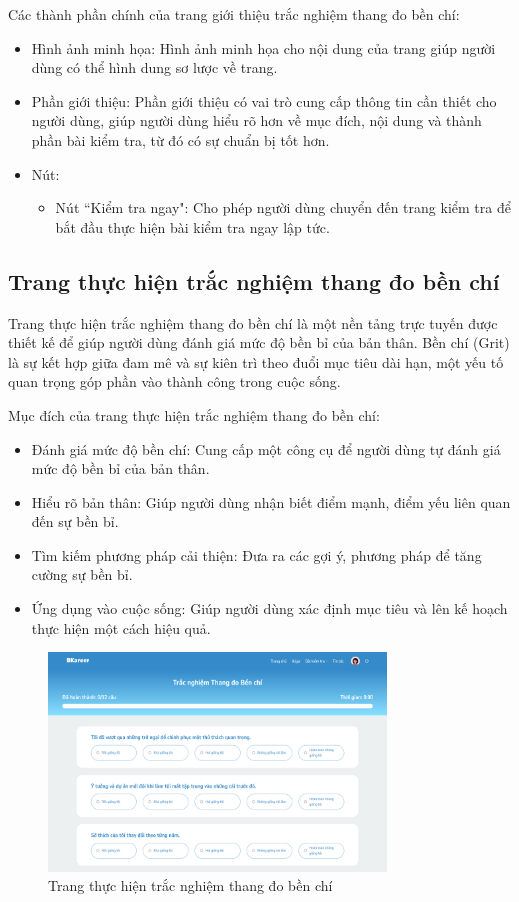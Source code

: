 Các thành phần chính của trang giới thiệu trắc nghiệm thang đo bền chí:
\begin{itemize}
    \item Hình ảnh minh họa: Hình ảnh minh họa cho nội dung của trang giúp người dùng có thể hình dung sơ lược về trang.
    \item Phần giới thiệu: Phần giới thiệu có vai trò cung cấp thông tin cần thiết cho người dùng, giúp người dùng hiểu rõ hơn về mục đích, nội dung và thành phần bài kiểm tra, từ đó có sự chuẩn bị tốt hơn.
    \item Nút:
        \begin{itemize}
            \item Nút ``Kiểm tra ngay": Cho phép người dùng chuyển đến trang kiểm tra để bắt đầu thực hiện bài kiểm tra ngay lập tức.
        \end{itemize}
\end{itemize}


\subsection{Trang thực hiện trắc nghiệm thang đo bền chí}
Trang thực hiện trắc nghiệm thang đo bền chí là một nền tảng trực tuyến được thiết kế để giúp người dùng đánh giá mức độ bền bỉ của bản thân. Bền chí (Grit) là sự kết hợp giữa đam mê và sự kiên trì theo đuổi mục tiêu dài hạn, một yếu tố quan trọng góp phần vào thành công trong cuộc sống.

Mục đích của trang thực hiện trắc nghiệm thang đo bền chí:
\begin{itemize}
    \item Đánh giá mức độ bền chí: Cung cấp một công cụ để người dùng tự đánh giá mức độ bền bỉ của bản thân.
    \item Hiểu rõ bản thân: Giúp người dùng nhận biết điểm mạnh, điểm yếu liên quan đến sự bền bỉ.
    \item Tìm kiếm phương pháp cải thiện: Đưa ra các gợi ý, phương pháp để tăng cường sự bền bỉ.
    \item Ứng dụng vào cuộc sống: Giúp người dùng xác định mục tiêu và lên kế hoạch thực hiện một cách hiệu quả.
\end{itemize}

\begin{figure}[H]
    \centering
    \includegraphics[width=0.8\textwidth]
    {images/chap5/gritTest.png}
    \vspace{0.5cm}
    \caption{Trang thực hiện trắc nghiệm thang đo bền chí}
\end{figure}

